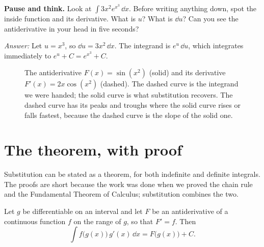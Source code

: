 \begin{recoverybox}
\textbf{Pause and think.} Look at $\int 3x^2 e^{x^3}\,\dd x$. Before writing anything down, spot the inside function and its derivative. What is $u$? What is $\dd u$? Can you see the antiderivative in your head in five seconds?

\emph{Answer:} Let $u = x^3$, so $\dd u = 3x^2\,\dd x$. The integrand is $e^u\,\dd u$, which integrates immediately to $e^u + C = e^{x^3} + C$.
\end{recoverybox}

\begin{figure}[H]
\centering
{}
\caption{The antiderivative $F(x)=\sin(x^2)$ (solid) and its derivative
$F'(x)=2x\cos(x^2)$ (dashed). The dashed curve is the integrand we were handed; the
solid curve is what substitution recovers. The dashed curve has its peaks and
troughs where the solid curve rises or falls fastest, because the dashed curve is the
slope of the solid one.}
\label{ch22:fig-pattern}
\end{figure}

\section{The theorem, with proof}
\label{ch22:theorem}

Substitution can be stated as a theorem, for both indefinite and definite
integrals. The proofs are short because the work was done when we proved the chain
rule and the Fundamental Theorem of Calculus; substitution combines the two.

\begin{theorem}
\label{ch22:thm-indef}
Let $g$ be differentiable on an interval and let $F$ be an antiderivative of a
continuous function $f$ on the range of $g$, so that $F' = f$. Then
\[
  \int f\!\big(g(x)\big)\,g'(x)\,\dd x = F\!\big(g(x)\big) + C.
\]
\end{theorem}

